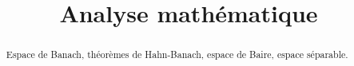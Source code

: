 \documentclass[a4paper, 12pt]{article}
\title{Analyse mathématique}
\begin{document}
\maketitle
\begin{abstract}
	Espace de Banach, théorèmes de Hahn-Banach, espace de Baire, espace
	séparable.
\end{abstract}

\tableofcontents







\end{document}
